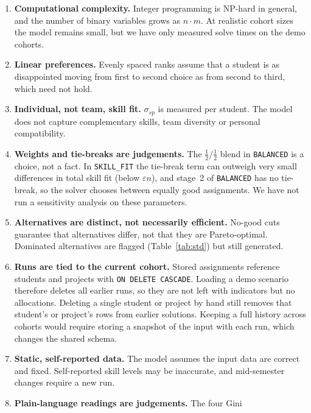 \documentclass[11pt,a4paper]{article}
\newcommand{\code}[1]{\texttt{#1}}
\begin{document}
\begin{enumerate}
  \item \textbf{Computational complexity.} Integer programming is NP-hard in
        general, and the number of binary variables grows as $n \cdot m$. At
        realistic cohort sizes the model remains small, but we have only
        measured solve times on the demo cohorts.
  \item \textbf{Linear preferences.} Evenly spaced ranks assume that a
        student is as disappointed moving from first to second choice as
        from second to third, which need not hold.
  \item \textbf{Individual, not team, skill fit.} $\sigma_{sp}$ is measured
        per student. The model does not capture complementary skills, team
        diversity or personal compatibility.
  \item \textbf{Weights and tie-breaks are judgements.} The $\tfrac12/\tfrac12$
        blend in \code{BALANCED} is a choice, not a fact. In
        \code{SKILL\_FIT} the tie-break term can outweigh very small
        differences in total skill fit (below $\varepsilon n$), and stage~2 of
        \code{BALANCED} has no tie-break, so the solver chooses between
        equally good assignments. We have not run a sensitivity analysis on
        these parameters.
  \item \textbf{Alternatives are distinct, not necessarily efficient.} No-good
        cuts guarantee that alternatives differ, not that they are
        Pareto-optimal. Dominated alternatives are flagged
        (Table~\ref{tab:std}) but still generated.
  \item \textbf{Runs are tied to the current cohort.} Stored assignments
        reference students and projects with \code{ON DELETE CASCADE}.
        Loading a demo scenario therefore deletes all earlier runs, so they
        are not left with indicators but no allocations. Deleting a single
        student or project by hand still removes that student's or
        project's rows from earlier solutions. Keeping a full history across
        cohorts would require storing a snapshot of the input with each run,
        which changes the shared schema.
  \item \textbf{Static, self-reported data.} The model assumes the input data
        are correct and fixed. Self-reported skill levels may be inaccurate,
        and mid-semester changes require a new run.
  \item \textbf{Plain-language readings are judgements.} The four Gini

\end{enumerate}
\end{document}
